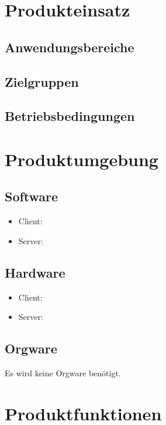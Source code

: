 \documentclass[a4paper]{scrreprt}
\begin{document}
        
  
\chapter{Produkteinsatz}
    \section{Anwendungsbereiche}
		   
     
	\section{Zielgruppen}
        
    
	\section{Betriebsbedingungen}
       
	
			
 
\chapter{Produktumgebung}
	\section{Software}
        \begin{itemize}
      		\item Client:
      		
          	\item Server:
            
        \end{itemize}
    \section{Hardware}   
        \begin{itemize}
          	\item Client:
            
          	\item Server:
           
        \end{itemize}
     \section{Orgware}
             Es wird keine Orgware benötigt.
 
\chapter{Produktfunktionen}
	
\end{document}
